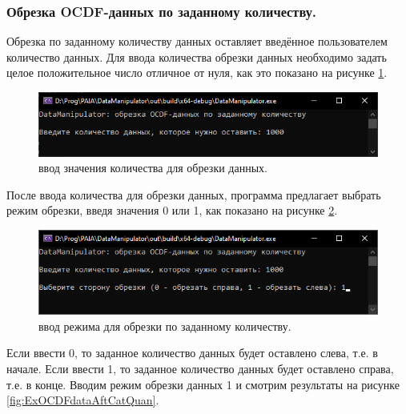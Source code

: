 \subsubsection{ \standartTitleFont
  Обрезка OCDF-данных по заданному количеству. 
} \label{subsubsec:OCDFCutQuan}

{\standartFont

  \par Обрезка по заданному количеству данных оставляет введённое пользователем количество данных. Для ввода количества обрезки данных необходимо задать целое положительное число отличное от нуля, как это показано на рисунке \ref{fig:OCDFcutquan1}. 

  \begin{figure}[H]
    \centering
    \includegraphics{images/forDataManipulator/OCDFcutquantitystage1.png}
    \caption{ввод значения количества для обрезки данных.} 
    \label{fig:OCDFcutquan1}
  \end{figure}

  \par После ввода количества для обрезки данных, программа предлагает выбрать режим обрезки, введя значения 0 или 1, как показано на рисунке \ref{fig:OCDFcutquan2}. 

  \begin{figure}[H]
    \centering
    \includegraphics{images/forDataManipulator/OCDFcutquantitystage2.png}
    \caption{ввод режима для обрезки по заданному количеству.} 
    \label{fig:OCDFcutquan2}
  \end{figure}

  \par Если ввести 0, то заданное количество данных будет оставлено слева, т.е. в начале. Если ввести 1, то заданное количество данных будет оставлено справа, т.е. в конце. Вводим режим обрезки данных 1 и смотрим результаты на рисунке \ref{fig:ExOCDFdataAftCatQuan}. 

}
